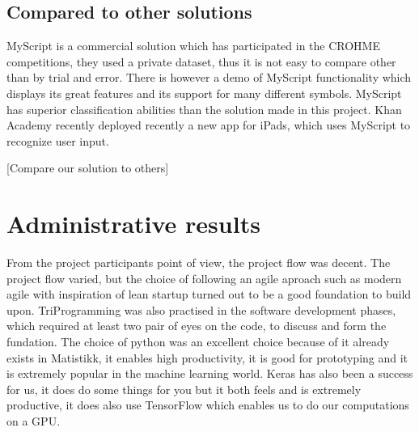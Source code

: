 



\subsection{Compared to other solutions}

MyScript is a commercial solution which has participated in the CROHME competitions, they used a private dataset, thus it is not easy to compare other than by trial and error. There is however a demo of MyScript functionality which displays its great features and its support for many different symbols. MyScript has superior classification abilities than the solution made in this project. Khan Academy recently deployed recently a new app for iPads, which uses MyScript to recognize user input.


[Compare our solution to others]


\section{Administrative results}
From the project participants point of view, the project flow was decent. The project flow varied, but the choice of following an agile aproach such as modern agile with inspiration of lean startup turned out to be a good foundation to build upon. TriProgramming was also practised in the software development phases, which required at least two pair of eyes on the code, to discuss and form the fundation. The choice of python was an excellent choice because of it already exists in Matistikk, it enables high productivity, it is good for prototyping and it is extremely popular in the machine learning world. Keras has also been a success for us, it does do some things for you but it both feels and is extremely productive, it does also use TensorFlow which enables us to do our computations on a GPU. 

